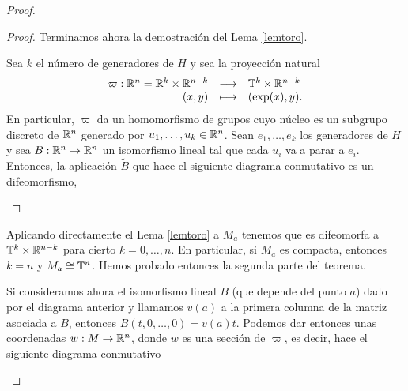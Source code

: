 \begin{proof}
\begin{proof}
Terminamos ahora la demostración del Lema \ref{lemtoro}.
 
  Sea $k$ el número de generadores de $H$ y sea la proyección natural
  \[
    \begin{array}{rcl}
      \varpi: \mathbb{R}^n = \mathbb{R}^k \times \mathbb{R}^{n-k} & \longrightarrow & \mathbb{T}^k \times \mathbb{R}^{n-k} \\
      (x,y) & \longmapsto & (\exp(x), y).
    \end{array}
  \]
  En particular, $\varpi$ da un homomorfismo de grupos cuyo núcleo es un subgrupo discreto de $\mathbb{R}^n$ generado por $u_1,\dots,u_k \in \mathbb{R}^n$. 
  Sean $e_1,\dots,e_k$ los generadores de $H$ y sea $B:\mathbb{R}^n \rightarrow \mathbb{R}^n$ un isomorfismo lineal tal que cada $u_i$ va a parar a $e_i$. Entonces, la aplicación $\tilde{B}$ que hace el siguiente diagrama conmutativo es un difeomorfismo,
  \begin{center}
   \end{center}
  
\end{proof}

Aplicando directamente el Lema \ref{lemtoro} a $M_a$ tenemos que es difeomorfa a $\mathbb{T}^k\times \mathbb{R}^{n-k}$ para cierto $k=0,\dots,n$. En particular, si $M_a$ es compacta, entonces $k=n$ y $M_a\cong \mathbb{T}^n$. Hemos probado entonces la segunda parte del teorema.

Si consideramos ahora el isomorfismo lineal $B$ (que depende del punto $a$) dado por el diagrama anterior y llamamos $v(a)$ a la primera columna de la matriz asociada a $B$, entonces $B(t,0,\dots,0)=v(a)t$. Podemos dar entonces unas coordenadas $w:M\rightarrow \mathbb{R}^n$, donde $w$ es una sección de $\varpi$, es decir, hace el siguiente diagrama conmutativo
\begin{center}
\end{center}


\end{proof}
